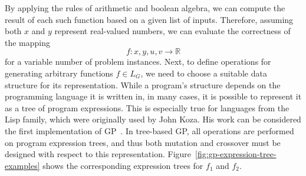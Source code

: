 By applying the rules of arithmetic and boolean algebra, we can compute the result of each such function based on a given list of inputs.
Therefore, assuming both $x$ and $y$ represent real-valued numbers, we can evaluate the correctness of the mapping 
\begin{equation*}
    f: x, y, u, v \to \mathbb{R}
\end{equation*}
for a variable number of problem instances.
Next, to define operations for generating arbitrary functions $f \in L_G$, we need to choose a suitable data structure for its representation.
While a program's structure depends on the programming language it is written in, in many cases, it is possible to represent it as a tree of program expressions.
This is especially true for languages from the Lisp family, which were originally used by John Koza. 
His work can be considered the first implementation of GP~\cite{koza1994genetic}.
In tree-based GP, all operations are performed on program expression trees, and thus both mutation and crossover must be designed with respect to this representation.
Figure~\ref{fig:gp-expression-tree-examples} shows the corresponding expression trees for $f_1$ and $f_2$.
